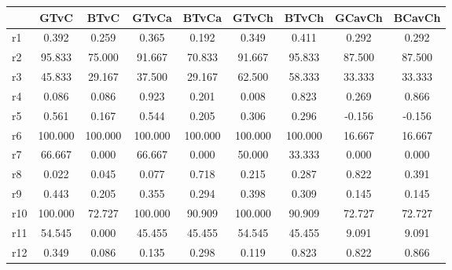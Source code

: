 \begin{table}[htbp]
\begin{tabular}{lcccccccc} \hline \hline
 & GTvC  & BTvC  & GTvCa  & BTvCa  & GTvCh  & BTvCh  & GCavCh  & BCavCh  \\  \hline 
r1 &     0.392 &     0.259 &     0.365 &     0.192 &     0.349 &     0.411 &     0.292 &     0.292 \\  
r2 &    95.833 &    75.000 &    91.667 &    70.833 &    91.667 &    95.833 &    87.500 &    87.500 \\  
r3 &    45.833 &    29.167 &    37.500 &    29.167 &    62.500 &    58.333 &    33.333 &    33.333 \\  
r4 &     0.086 &     0.086 &     0.923 &     0.201 &     0.008 &     0.823 &     0.269 &     0.866 \\  
r5 &     0.561 &     0.167 &     0.544 &     0.205 &     0.306 &     0.296 &    -0.156 &    -0.156 \\  
r6 &   100.000 &   100.000 &   100.000 &   100.000 &   100.000 &   100.000 &    16.667 &    16.667 \\  
r7 &    66.667 &     0.000 &    66.667 &     0.000 &    50.000 &    33.333 &     0.000 &     0.000 \\  
r8 &     0.022 &     0.045 &     0.077 &     0.718 &     0.215 &     0.287 &     0.822 &     0.391 \\  
r9 &     0.443 &     0.205 &     0.355 &     0.294 &     0.398 &     0.309 &     0.145 &     0.145 \\  
r10 &   100.000 &    72.727 &   100.000 &    90.909 &   100.000 &    90.909 &    72.727 &    72.727 \\  
r11 &    54.545 &     0.000 &    45.455 &    45.455 &    54.545 &    45.455 &     9.091 &     9.091 \\  
r12 &     0.349 &     0.086 &     0.135 &     0.298 &     0.119 &     0.823 &     0.822 &     0.866 \\  
\hline \hline \end{tabular}
\end{table}
